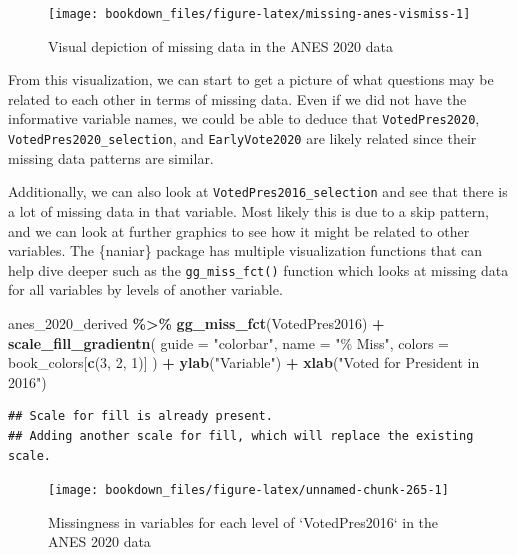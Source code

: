 \documentclass[
]{krantz}
\makeatletter
\newenvironment{Shaded}{\begin{snugshade}}{\end{snugshade}}
\newcommand{\AttributeTok}[1]{\textcolor[rgb]{0.27,0.27,0.27}{#1}}
\newcommand{\DecValTok}[1]{\textcolor[rgb]{0.06,0.06,0.06}{#1}}
\newcommand{\FunctionTok}[1]{\textcolor[rgb]{0.27,0.27,0.27}{\textbf{#1}}}
\newcommand{\NormalTok}[1]{#1}
\newcommand{\SpecialCharTok}[1]{\textcolor[rgb]{0.43,0.43,0.43}{\textbf{#1}}}
\newcommand{\StringTok}[1]{\textcolor[rgb]{0.5,0.5,0.5}{#1}}
\newenvironment{kframe}{%
\medskip{}
\setlength{\fboxsep}{.8em}
 \def\at@end@of@kframe{}%
 \ifinner\ifhmode%
  \def\at@end@of@kframe{\end{minipage}}%
  \begin{minipage}{\columnwidth}%
 \fi\fi%
 \def\FrameCommand##1{\hskip\@totalleftmargin \hskip-\fboxsep
 \colorbox{shadecolor}{##1}\hskip-\fboxsep
     \hskip-\linewidth \hskip-\@totalleftmargin \hskip\columnwidth}%
 \MakeFramed {\advance\hsize-\width
   \@totalleftmargin\z@ \linewidth\hsize
   \@setminipage}}%
 {\par\unskip\endMakeFramed%
 \at@end@of@kframe}
\renewenvironment{Shaded}{\begin{kframe}}{\end{kframe}}
\makeatother
\begin{document}
\begin{figure}
\texttt{[image: bookdown\_files/figure-latex/missing-anes-vismiss-1]} \caption{Visual depiction of missing data in the ANES 2020 data}\label{fig:missing-anes-vismiss}
\end{figure}

From this visualization, we can start to get a picture of what questions may be related to each other in terms of missing data. Even if we did not have the informative variable names, we could be able to deduce that \texttt{VotedPres2020}, \texttt{VotedPres2020\_selection}, and \texttt{EarlyVote2020} are likely related since their missing data patterns are similar.

Additionally, we can also look at \texttt{VotedPres2016\_selection} and see that there is a lot of missing data in that variable. Most likely this is due to a skip pattern, and we can look at further graphics to see how it might be related to other variables. The \{naniar\} package has multiple visualization functions that can help dive deeper such as the \texttt{gg\_miss\_fct()} function which looks at missing data for all variables by levels of another variable.

\begin{Shaded}
\begin{Highlighting}[]
\NormalTok{anes\_2020\_derived }\SpecialCharTok{\%\textgreater{}\%}
  \FunctionTok{gg\_miss\_fct}\NormalTok{(VotedPres2016) }\SpecialCharTok{+}
  \FunctionTok{scale\_fill\_gradientn}\NormalTok{(}
    \AttributeTok{guide =} \StringTok{"colorbar"}\NormalTok{,}
    \AttributeTok{name =} \StringTok{"\% Miss"}\NormalTok{,}
    \AttributeTok{colors =}\NormalTok{ book\_colors[}\FunctionTok{c}\NormalTok{(}\DecValTok{3}\NormalTok{, }\DecValTok{2}\NormalTok{, }\DecValTok{1}\NormalTok{)]}
\NormalTok{  ) }\SpecialCharTok{+}
  \FunctionTok{ylab}\NormalTok{(}\StringTok{"Variable"}\NormalTok{) }\SpecialCharTok{+}
  \FunctionTok{xlab}\NormalTok{(}\StringTok{"Voted for President in 2016"}\NormalTok{)}
\end{Highlighting}
\end{Shaded}

\begin{verbatim}
## Scale for fill is already present.
## Adding another scale for fill, which will replace the existing scale.
\end{verbatim}

\begin{figure}
\texttt{[image: bookdown\_files/figure-latex/unnamed-chunk-265-1]} \caption{Missingness in variables for each level of `VotedPres2016` in the ANES 2020 data}\label{fig:unnamed-chunk-265}
\end{figure}
\end{document}
